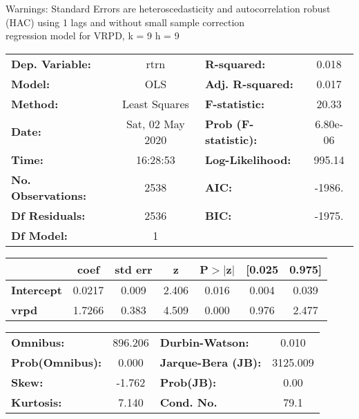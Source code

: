 Warnings: \newline
 [1] Standard Errors are heteroscedasticity and autocorrelation robust (HAC) using 1 lags and without small sample correction\\ 

regression model for VRPD, k = 9 h = 9\begin{center}
\begin{tabular}{lclc}
\toprule
\textbf{Dep. Variable:}    &       rtrn       & \textbf{  R-squared:         } &     0.018   \\
\textbf{Model:}            &       OLS        & \textbf{  Adj. R-squared:    } &     0.017   \\
\textbf{Method:}           &  Least Squares   & \textbf{  F-statistic:       } &     20.33   \\
\textbf{Date:}             & Sat, 02 May 2020 & \textbf{  Prob (F-statistic):} &  6.80e-06   \\
\textbf{Time:}             &     16:28:53     & \textbf{  Log-Likelihood:    } &    995.14   \\
\textbf{No. Observations:} &        2538      & \textbf{  AIC:               } &    -1986.   \\
\textbf{Df Residuals:}     &        2536      & \textbf{  BIC:               } &    -1975.   \\
\textbf{Df Model:}         &           1      & \textbf{                     } &             \\
\bottomrule
\end{tabular}
\begin{tabular}{lcccccc}
                   & \textbf{coef} & \textbf{std err} & \textbf{z} & \textbf{P$> |$z$|$} & \textbf{[0.025} & \textbf{0.975]}  \\
\midrule
\textbf{Intercept} &       0.0217  &        0.009     &     2.406  &         0.016        &        0.004    &        0.039     \\
\textbf{vrpd}      &       1.7266  &        0.383     &     4.509  &         0.000        &        0.976    &        2.477     \\
\bottomrule
\end{tabular}
\begin{tabular}{lclc}
\textbf{Omnibus:}       & 896.206 & \textbf{  Durbin-Watson:     } &    0.010  \\
\textbf{Prob(Omnibus):} &   0.000 & \textbf{  Jarque-Bera (JB):  } & 3125.009  \\
\textbf{Skew:}          &  -1.762 & \textbf{  Prob(JB):          } &     0.00  \\
\textbf{Kurtosis:}      &   7.140 & \textbf{  Cond. No.          } &     79.1  \\
\bottomrule
\end{tabular}
\end{center}

